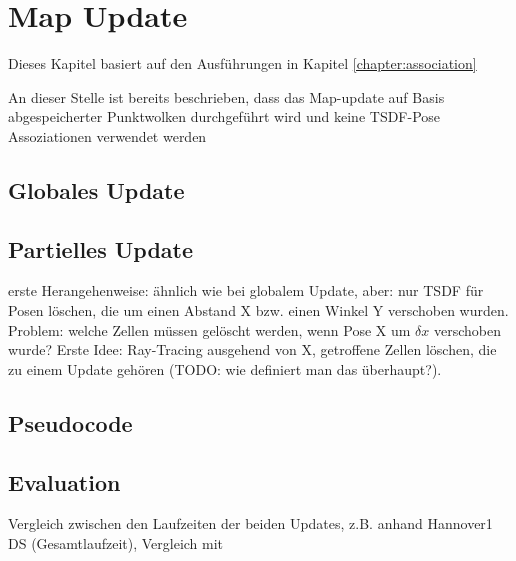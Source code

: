 \chapter{Map Update}
\label{chapter:map_update}

Dieses Kapitel basiert auf den Ausführungen in Kapitel \ref{chapter:association}

An dieser Stelle ist bereits beschrieben, dass das Map-update auf Basis abgespeicherter Punktwolken durchgeführt wird und keine TSDF-Pose Assoziationen verwendet werden

\section{Globales Update}

\section{Partielles Update}

erste Herangehenweise: ähnlich wie bei globalem Update, aber: nur TSDF für Posen löschen, die um einen Abstand X bzw. einen Winkel Y verschoben wurden. Problem: welche Zellen müssen gelöscht werden, wenn Pose X um $\delta x$ verschoben wurde? Erste Idee: Ray-Tracing ausgehend von X, getroffene Zellen löschen, die zu einem Update gehören (TODO: wie definiert man das überhaupt?).

\section{Pseudocode}

\section{Evaluation}

Vergleich zwischen den Laufzeiten der beiden Updates, z.B. anhand Hannover1 DS (Gesamtlaufzeit), Vergleich mit 
